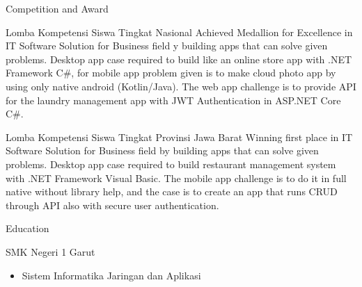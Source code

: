 \documentclass{article}
\newlength{\tabin}
\newlength{\secsep}
\newcommand{\lineunder}{\vspace*{-8pt} \\ \hspace*{-6pt} \hrulefill \\ \vspace*{-15pt}}
\newenvironment{tabbedsection}[1]{
  \begin{list}{}{
      \setlength{\itemsep}{0pt}
      \setlength{\labelsep}{0pt}
      \setlength{\labelwidth}{0pt}
      \setlength{\leftmargin}{\tabin}
      \setlength{\rightmargin}{\tabin}
      \setlength{\listparindent}{0pt}
      \setlength{\parsep}{0pt}
      \setlength{\parskip}{0pt}
      \setlength{\partopsep}{0pt}
      \setlength{\topsep}{#1}
    }
  \item[]
}{\end{list}}
\newenvironment{resume_section}[1]{
  \filbreak
  \vspace{2\secsep}
  \textsc{\large#1}
  \lineunder
  \begin{tabbedsection}{\secsep}
}{\end{tabbedsection}}
\newenvironment{resume_subsection}[2][]{
  \textbf{#2} \hfill {\footnotesize #1} \hspace{2em}
  \begin{tabbedsection}{0.5\secsep}
}{\end{tabbedsection}}
\newenvironment{subitems}{
  \renewcommand{\labelitemi}{-}
  \begin{itemize}
      \setlength{\labelsep}{1em}
}{\end{itemize}}
\begin{document}
\begin{resume_section}{Competition and Award}

  \begin{resume_subsection}[(October 2021)]{Lomba Kompetensi Siswa Tingkat Nasional}
    Achieved Medallion for Excellence in IT Software Solution for Business field y building apps that can solve given problems.
    Desktop app case required to build like an online store app with .NET Framework C\#, for mobile app problem given is to make cloud photo app by using only native android (Kotlin/Java).
    The web app challenge is to provide API for the laundry management app with JWT Authentication in ASP.NET Core C\#.
  \end{resume_subsection}

  \begin{resume_subsection}[(August 2021)]{Lomba Kompetensi Siswa Tingkat Provinsi Jawa Barat}
    Winning first place in IT Software Solution for Business field by building apps that can solve given problems.
    Desktop app case required to build restaurant management system with .NET Framework Visual Basic.
    The mobile app challenge is to do it in full native without library help, and the case is to create an app that runs CRUD through API also with secure user authentication.
  \end{resume_subsection}

\end{resume_section}

\begin{resume_section}{Education}
  \begin{resume_subsection}{SMK Negeri 1 Garut}
    \begin{subitems}
      \item Sistem Informatika Jaringan dan Aplikasi
    \end{subitems}
  \end{resume_subsection}
\end{resume_section}
\end{document}
